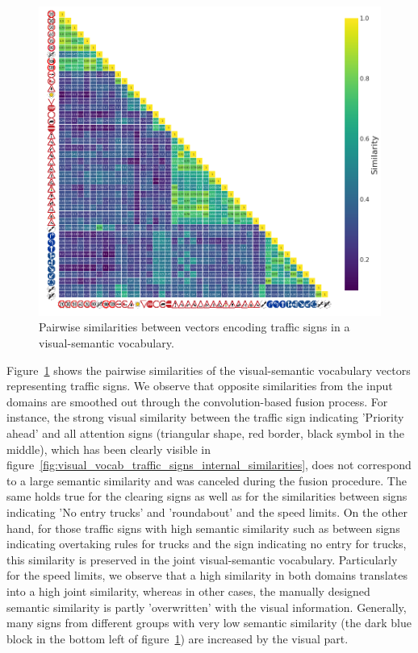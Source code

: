 \begin{figure}[t]
    \centering
    \includegraphics[width=0.8\linewidth]{imgs/visual_semantic_vocab_traffic_signs_internal_similarities.png}
    \caption{Pairwise similarities between vectors encoding traffic signs in a visual-semantic vocabulary.}
    \label{fig:visual_semantic_vocab_traffic_signs_internal_similarities}
\end{figure}

Figure~\ref{fig:visual_semantic_vocab_traffic_signs_internal_similarities} shows the pairwise similarities of the visual-semantic vocabulary vectors representing traffic signs.
We observe that opposite similarities from the input domains are smoothed out through the convolution-based fusion process.
For instance, the strong visual similarity between the traffic sign indicating 'Priority ahead' and all attention signs (triangular shape, red border, black symbol in the middle), which has been clearly visible in figure~\ref{fig:visual_vocab_traffic_signs_internal_similarities}, does not correspond to a large semantic similarity and was canceled during the fusion procedure.
The same holds true for the clearing signs as well as for the similarities between signs indicating 'No entry trucks' and 'roundabout' and the speed limits.
On the other hand, for those traffic signs with high semantic similarity such as between signs indicating overtaking rules for trucks and the sign indicating no entry for trucks, this similarity is preserved in the joint visual-semantic vocabulary. 
Particularly for the speed limits, we observe that a high similarity in both domains translates into a high joint similarity, whereas in other cases, the manually designed semantic similarity is partly 'overwritten' with the visual information.
Generally, many signs from different groups with very low semantic similarity (the dark blue block in the bottom left of figure~\ref{fig:visual_semantic_vocab_traffic_signs_internal_similarities}) are increased by the visual part. 

